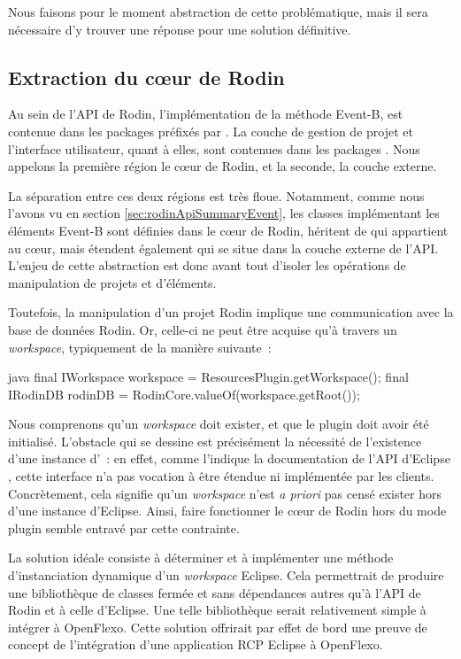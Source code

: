 Nous faisons pour le moment abstraction de cette problématique, mais il sera nécessaire d'y trouver une réponse pour une solution définitive.


\subsection{Extraction du cœur de Rodin}

Au sein de l'API de Rodin, l'implémentation de la méthode Event-B, est contenue dans les packages préfixés par .
La couche de gestion de projet et l'interface utilisateur, quant à elles, sont contenues dans les packages .
Nous appelons la première région le cœur de Rodin, et la seconde, la couche externe.

La séparation entre ces deux régions est très floue.
Notamment, comme nous l'avons vu en section \ref{sec:rodinApiSummaryEvent}, les classes implémentant les éléments Event-B sont définies dans le cœur de Rodin, %
héritent de  qui appartient au cœur, mais étendent également  qui se situe dans la couche externe de l'API.
L'enjeu de cette abstraction est donc avant tout d'isoler les opérations de manipulation de projets et d'éléments.

Toutefois, la manipulation d'un projet Rodin implique une communication avec la base de données Rodin.
Or, celle-ci ne peut être acquise qu'à travers un \textit{workspace}, typiquement de la manière suivante~:

\begin{imtaCode}{java}
final IWorkspace workspace = ResourcesPlugin.getWorkspace();
final IRodinDB rodinDB = RodinCore.valueOf(workspace.getRoot());
\end{imtaCode}

Nous comprenons qu'un \textit{workspace} doit exister, et que le plugin  doit avoir été initialisé.
L'obstacle qui se dessine est précisément la nécessité de l'existence d'une instance d'~: en effet, comme l'indique la documentation %
de l'API d'Eclipse \cite{eclipseiworkspace}, cette interface n'a pas vocation à être étendue ni implémentée par les clients.
Concrètement, cela signifie qu'un \textit{workspace} n'est \textit{a priori} pas censé exister hors d'une instance d'Eclipse.
Ainsi, faire fonctionner le cœur de Rodin hors du mode plugin semble entravé par cette contrainte.

La solution idéale consiste à déterminer et à implémenter une méthode d'instanciation dynamique d'un \textit{workspace} Eclipse.
Cela permettrait de produire une bibliothèque de classes fermée et sans dépendances autres qu'à l'API de Rodin et à celle d'Eclipse.
Une telle bibliothèque serait relativement simple à intégrer à OpenFlexo.
Cette solution offrirait par effet de bord une preuve de concept de l'intégration d'une application RCP Eclipse à OpenFlexo.

